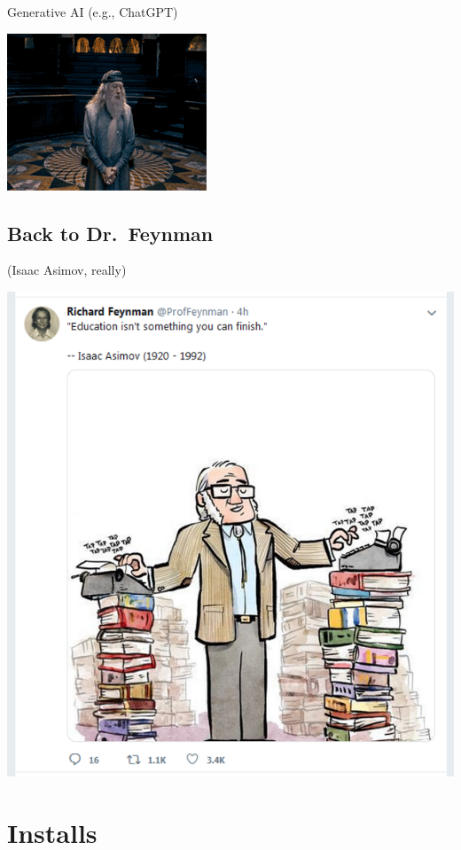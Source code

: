 \documentclass[
  letterpaper,
  DIV=11,
  numbers=noendperiod,
  oneside]{scrartcl}
\begin{document}
Generative AI (e.g., ChatGPT)

\includegraphics{./images/dumbledore.gif}

\hypertarget{back-to-dr.-feynman}{%
\subsection{Back to Dr.~Feynman}\label{back-to-dr.-feynman}}

(Isaac Asimov, really)

\includegraphics{./images/feynman_learning.png}

\hypertarget{installs}{%
\section{Installs}\label{installs}}
\end{document}

